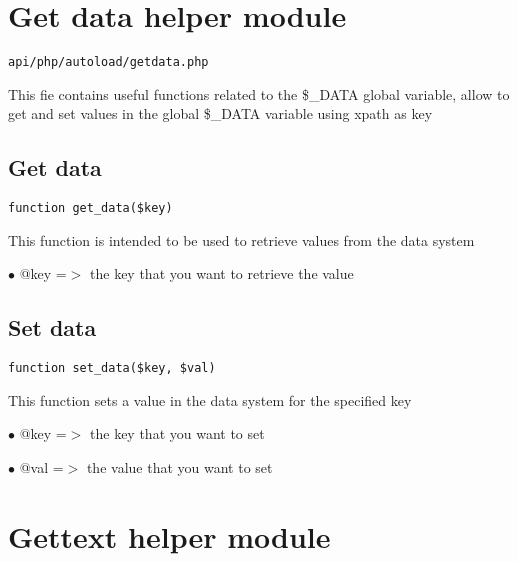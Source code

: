 \documentclass[a4paper]{book}
\begin{document}
\hypertarget{toc142}{}
\section{Get data helper module}

\begin{lstlisting}
api/php/autoload/getdata.php
\end{lstlisting}

This fie contains useful functions related to the \$\_DATA global variable, allow to get and set
values in the global \$\_DATA variable using xpath as key

\hypertarget{toc143}{}
\subsection{Get data}

\begin{lstlisting}
function get_data($key)
\end{lstlisting}

This function is intended to be used to retrieve values from the
data system

\begin{compactitem}
\item[\color{myblue}$\bullet$] @key =$>$ the key that you want to retrieve the value
\end{compactitem}

\hypertarget{toc144}{}
\subsection{Set data}

\begin{lstlisting}
function set_data($key, $val)
\end{lstlisting}

This function sets a value in the data system for the specified key

\begin{compactitem}
\item[\color{myblue}$\bullet$] @key =$>$ the key that you want to set
\item[\color{myblue}$\bullet$] @val =$>$ the value that you want to set
\end{compactitem}

\hypertarget{toc145}{}
\section{Gettext helper module}
\end{document}
